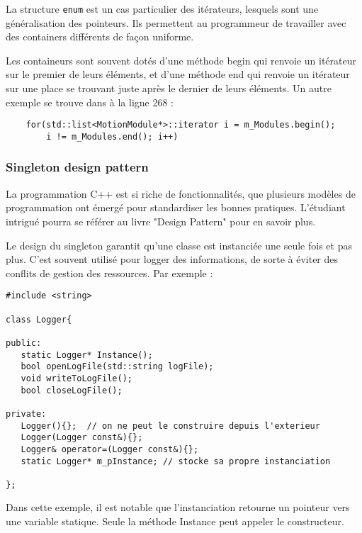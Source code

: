 \documentclass[abstracton]{scrartcl}
\begin{document}

La structure \lstinline{enum} est un cas particulier des itérateurs, lesquels sont une généralisation des pointeurs. Ils permettent au programmeur de travailler avec des containers différents de façon uniforme.

Les containeurs sont souvent dotés d'une méthode begin qui renvoie un itérateur sur le premier de leurs éléments, et d'une méthode end qui renvoie un itérateur sur une place se trouvant juste après le dernier de leurs éléments. Un autre exemple se trouve dans  à la ligne 268 :
\begin{lstlisting}
    for(std::list<MotionModule*>::iterator i = m_Modules.begin();
        i != m_Modules.end(); i++)
\end{lstlisting}

\subsubsection{Singleton design pattern}

La programmation C++ est si riche de fonctionnalités, que plusieurs modèles de programmation ont émergé pour standardiser les bonnes pratiques.
L'étudiant intrigué pourra se référer au livre "Design Pattern" \cite{gamma1995design} pour en savoir plus.

Le design du singleton garantit qu'une classe est instanciée une seule fois et pas plus. C'est souvent utilisé pour logger des informations, de sorte à éviter des conflits de gestion des ressources. Par exemple :



\begin{lstlisting}
#include <string>

class Logger{

public:
   static Logger* Instance();
   bool openLogFile(std::string logFile);
   void writeToLogFile();
   bool closeLogFile();

private:
   Logger(){};  // on ne peut le construire depuis l'exterieur
   Logger(Logger const&){};
   Logger& operator=(Logger const&){};
   static Logger* m_pInstance; // stocke sa propre instanciation

};
\end{lstlisting}
Dans cette exemple, il est notable que l'instanciation retourne un pointeur vers une variable statique. Seule la méthode Instance peut appeler le constructeur.
\end{document}
